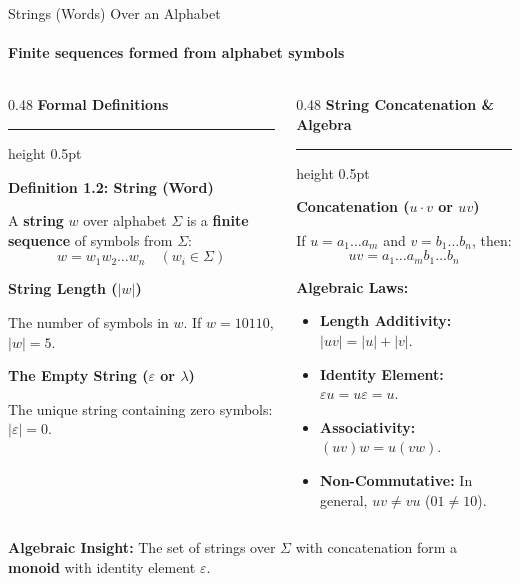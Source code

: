 \documentclass[aspectratio=169, 10pt]{beamer}
\newcommand{\colheader}[1]{%
  {\noindent\footnotesize\bfseries\color{gimpanavy}#1}%
  \vspace{0.02cm}%
  {\color{gimpanavy!30}\hrule height 0.5pt}%
  \vspace{0.05cm}%
}
\newcommand{\cardtitle}[1]{{\noindent\footnotesize\bfseries\color{gimpanavy}#1}\par\vspace{0.03cm}}
\newcommand{\greentitle}[1]{{\noindent\footnotesize\bfseries\color{accentGreen}#1}\par\vspace{0.03cm}}
\begin{document}
\begin{frame}{Strings (Words) Over an Alphabet}
  \framesubtitle{Finite sequences formed from alphabet symbols}
  
  \begin{columns}[T]
    \begin{column}{0.48\textwidth}
      \colheader{Formal Definitions}
      \begin{tcolorbox}[conceptcard]
        \cardtitle{Definition 1.2: String (Word)}
        {\scriptsize
        A \textbf{string} $w$ over alphabet $\Sigma$ is a \textbf{finite sequence} of symbols from $\Sigma$:
        \[ w = w_1 w_2 \dots w_n \quad (w_i \in \Sigma) \]
        }
        \vspace{0.03cm}
        
        \cardtitle{String Length ($|w|$)}
        {\scriptsize
        The number of symbols in $w$. If $w = 10110$, $|w| = 5$.
        }
        \vspace{0.03cm}
        
        \cardtitle{The Empty String ($\varepsilon$ or $\lambda$)}
        {\scriptsize
        The unique string containing zero symbols: $|\varepsilon| = 0$.
        }
      \end{tcolorbox}
    \end{column}
    
    \begin{column}{0.48\textwidth}
      \colheader{String Concatenation \& Algebra}
      \begin{tcolorbox}[examplecard]
        \greentitle{Concatenation ($u \cdot v$ or $uv$)}
        {\scriptsize
        If $u = a_1 \dots a_m$ and $v = b_1 \dots b_n$, then:
        \[ uv = a_1 \dots a_m b_1 \dots b_n \]
        }
        \vspace{0.03cm}
        
        \greentitle{Algebraic Laws:}
        \begin{itemize}\setlength{\itemsep}{2pt}\scriptsize
          \item \textbf{Length Additivity:} $|uv| = |u| + |v|$.
          \item \textbf{Identity Element:} $\varepsilon u = u \varepsilon = u$.
          \item \textbf{Associativity:} $(uv)w = u(vw)$.
          \item \textbf{Non-Commutative:} In general, $uv \ne vu$ ($01 \ne 10$).
        \end{itemize}
      \end{tcolorbox}
    \end{column}
  \end{columns}
  
  \vspace{0.08cm}
  \begin{tcolorbox}[conceptcard]
    {\scriptsize\textbf{Algebraic Insight:} The set of strings over $\Sigma$ with concatenation form a \textbf{monoid} with identity element $\varepsilon$.}
  \end{tcolorbox}
\end{frame}
\end{document}
